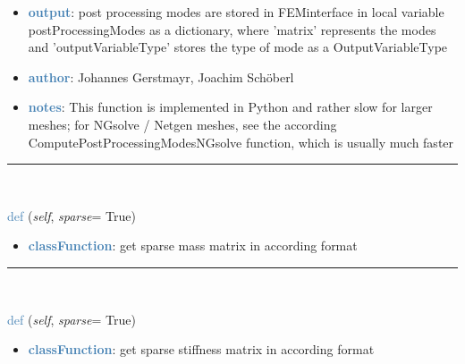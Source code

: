 \begin{itemize}[leftmargin=1.4cm]
\begin{itemize}[leftmargin=1.4cm]
\begin{itemize}[leftmargin=1.4cm]
\begin{itemize}[leftmargin=0.5cm]
\begin{itemize}[leftmargin=1.4cm]
\begin{itemize}[leftmargin=1.4cm]
\begin{itemize}[leftmargin=1.4cm]
\begin{itemize}[leftmargin=0.5cm]
\begin{itemize}[leftmargin=0.7cm]
\begin{itemize}[leftmargin=1.2cm]
\item[]{\it outputVariableType}: specify either exudyn.OutputVariableType.StressLocal or exudyn.OutputVariableType.StrainLocal as the desired output variables
\end{itemize}
\item[--]\textcolor{steelblue}{\bf output}: post processing modes are stored in FEMinterface in local variable postProcessingModes as a dictionary, where 'matrix' represents the modes and 'outputVariableType' stores the type of mode as a OutputVariableType
\item[--]\textcolor{steelblue}{\bf author}: Johannes Gerstmayr, Joachim Schöberl
\item[--]\textcolor{steelblue}{\bf notes}: This function is implemented in Python and rather slow for larger meshes; for NGsolve / Netgen meshes, see the according ComputePostProcessingModesNGsolve function, which is usually much faster
\vspace{12pt}\end{itemize}
%
\noindent\rule{8cm}{0.75pt}\vspace{1pt} \\ 
\begin{flushleft}
\noindent \textcolor{steelblue}{def {\bf {}}}\label{sec:FEM:FEMinterface:GetMassMatrix}
({\it self}, {\it sparse}= True)
\end{flushleft}
\setlength{\itemindent}{0.7cm}
\begin{itemize}[leftmargin=0.7cm]
\item[--]\textcolor{steelblue}{\bf classFunction}: get sparse mass matrix in according format
\vspace{12pt}\end{itemize}
%
\noindent\rule{8cm}{0.75pt}\vspace{1pt} \\ 
\begin{flushleft}
\noindent \textcolor{steelblue}{def {\bf {}}}\label{sec:FEM:FEMinterface:GetStiffnessMatrix}
({\it self}, {\it sparse}= True)
\end{flushleft}
\setlength{\itemindent}{0.7cm}
\begin{itemize}[leftmargin=0.7cm]
\item[--]\textcolor{steelblue}{\bf classFunction}: get sparse stiffness matrix in according format
\vspace{12pt}\end{itemize}

\end{itemize}
\end{itemize}
\end{itemize}
\end{itemize}
\end{itemize}
\end{itemize}
\end{itemize}
\end{itemize}
